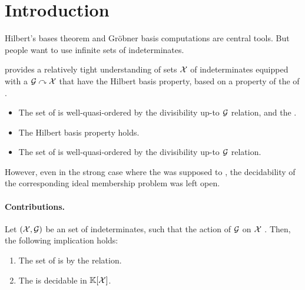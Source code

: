 \section{Introduction}
\label{sec:intro}

Hilbert’s bases theorem and Gröbner basis computations
are central tools. But people want to use infinite sets
of indeterminates.


\cite{GHOLAS24} provides a relatively tight understanding of sets $\mathcal{X}$ of
indeterminates equipped with a  $\mathcal{G} \curvearrowright \mathcal{X}$
that have the Hilbert basis property, based on a property of the
 of .

\begin{itemize}
    \item The set of  is well-quasi-ordered
        by the divisibility up-to $\mathcal{G}$ relation,
        and the  .
    \item The Hilbert basis property holds.
    \item The set of  is well-quasi-ordered
        by the divisibility up-to $\mathcal{G}$ relation.
\end{itemize}

However, even in the strong case where the  was supposed to
, the decidability of the corresponding ideal
membership problem was left open.

\paragraph{Contributions.}

\begin{theorem}
    \label{thm:decid-equiv-idl}
    Let $(\mathcal{X}, \mathcal{G})$ be an  set of indeterminates, such that the 
    action of $\mathcal{G}$ on $\mathcal{X}$ .
    Then, the following implication holds:
    \begin{enumerate}
        \item \label{item:mono-wqo-om1}
            The set of 
            is  by 
            the  relation.
        \item \label{item:decid-equiv-idl}
            The  is decidable in $\mathbb{K}[\mathcal{X}]$.
    \end{enumerate}
\end{theorem}

